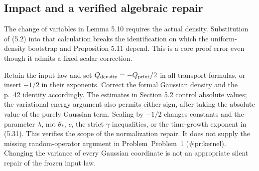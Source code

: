 \documentclass[10pt]{article}
\begin{document}
\subsection*{Impact and a verified algebraic repair}
The change of variables in Lemma 5.10 requires the actual density. Substitution of (5.2) into that calculation breaks the identification on which the uniform-density bootstrap and Proposition 5.11 depend. This is a core proof error even though it admits a fixed scalar correction.\par
Retain the input law and set \(Q_{\rm density}=-Q_{\rm print}/2\) in all transport formulas, or insert \(-1/2\) in their exponents. Correct the formal Gaussian density and the p. 42 identity accordingly. The estimates in Section 5.2 control absolute values; the variational energy argument also permits either sign, after taking the absolute value of the purely Gaussian term. Scaling by \(-1/2\) changes constants and the parameter \(\lambda\), not \(\theta_*\), \(c\), the strict \(\gamma\) inequalities, or the time-growth exponent in (5.31). This verifies the scope of the normalization repair. It does not supply the missing random-operator argument in Problem Problem 1 (\#pr:kernel). Changing the variance of every Gaussian coordinate is not an appropriate silent repair of the frozen input law.\par
\end{document}
